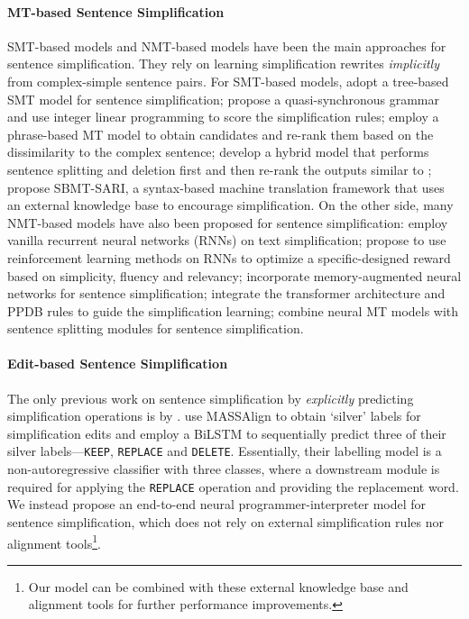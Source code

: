 \documentclass[11pt,a4paper]{article}
\begin{document}
\paragraph{MT-based Sentence Simplification}
SMT-based models and NMT-based models have been the main approaches for sentence simplification. They rely on learning simplification rewrites \textit{implicitly} from complex-simple sentence pairs. For SMT-based models, \citet{zhu2010monolingual}  adopt a tree-based SMT model for sentence simplification; \citet{woodsend2011learning} propose a quasi-synchronous grammar and use integer linear programming to score the simplification rules; \citet{wubben2012sentence} employ a phrase-based MT model to obtain candidates and re-rank them based on the dissimilarity to the complex sentence; \citet{narayan2014hybrid} develop a hybrid model that performs sentence splitting and deletion first and then re-rank the outputs similar to \citet{wubben2012sentence}; \citet{xu2016optimizing} propose SBMT-SARI, a syntax-based machine translation framework that uses an external knowledge base to encourage simplification. On the other side, many NMT-based models have also been proposed for sentence simplification: \citet{nisioi2017exploring} employ vanilla recurrent neural networks (RNNs) on text simplification; \citet{zhang2017sentence} propose to use reinforcement learning methods on RNNs to optimize a specific-designed reward based on simplicity, fluency and relevancy; \citet{vu2018sentence} incorporate memory-augmented neural networks for sentence simplification; \citet{zhao2018integrating} integrate the transformer architecture and PPDB rules to guide the simplification learning; \citet{sulem2018simple} combine neural MT models with sentence splitting modules for sentence simplification. 

\paragraph{Edit-based Sentence Simplification}
The only previous work on sentence simplification by \textit{explicitly} predicting simplification operations is by \citet{alva2017learning}. 
\citet{alva2017learning} use MASSAlign \citep{paetzold2017massalign} to obtain `silver' labels for simplification edits and employ a BiLSTM to sequentially predict three of their silver labels---\texttt{KEEP}, \texttt{REPLACE} and \texttt{DELETE}. 
Essentially, their labelling model is a non-autoregressive classifier with three classes, where a downstream module \citep{paetzold2017lexical} is required for applying the \texttt{REPLACE} operation and providing the replacement word.  We instead propose an end-to-end neural programmer-interpreter model for sentence simplification,  which does not rely on external simplification rules nor alignment tools\footnote{Our model can be combined with these external knowledge base and alignment tools for further performance improvements.}.
\end{document}

